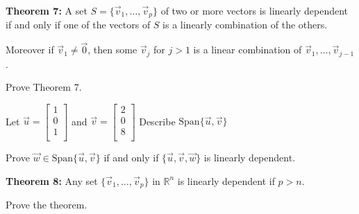 \begin{enumerate}
\vfill

{\bf Theorem 7:} A set $S=\{ \vec{v}_1, \dots, \vec{v}_p \}$ of two or more vectors is linearly dependent if and only if one of the vectors of $S$ is a linearly combination of the others.

Moreover if $\vec{v}_1\neq \vec{0}$, then some $\vec{v}_j$ for $j>1$ is a linear combination of $\vec{v}_1, \dots, \vec{v}_{j-1}$.

\Problem Prove Theorem 7.

\vfill

\newpage

\Problem Let $\vec{u}=\begin{bmatrix} 1\\ 0\\ 1\\ \end{bmatrix}$ and $\vec{v} = \begin{bmatrix} 2 \\ 0 \\ 8\\ \end{bmatrix}$
\Part Describe $\text{Span}\{\vec{u}, \vec{v}\}$

\vfill

\Part Prove $\vec{w} \in \text{Span}\{\vec{u}, \vec{v}\}$ if and only if $\{ \vec{u}, \vec{v}, \vec{w} \}$ is linearly dependent.

\vfill
\vfill

{\bf Theorem 8:} Any set $\{ \vec{v}_1, \dots, \vec{v}_p \}$ in $\mathbb{R}^n$ is linearly dependent if $p>n$.

\Problem Prove the theorem.

\vfill
\vfill
\vfill 
\end{enumerate}

